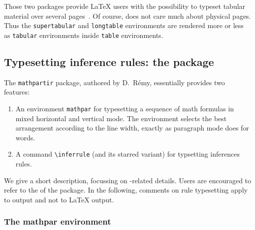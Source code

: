 Those two packages provide \LaTeX{} users with the
possibility to typeset tabular material over several
pages~\cite[Section~5.4]{latexbis}. Of course, \hevea{}
does not care much about physical pages.
Thus the \texttt{supertabular}
and \texttt{longtable} environments are rendered more or less
as \texttt{tabular} environments inside \texttt{table} environments.

\subsection{Typesetting inference rules: the
\label{mathpartir:package}  package}

The \texttt{mathpartir} package, authored by D.~R\'emy, essentially
provides two features:
\begin{enumerate}
\item
An environment \texttt{mathpar} for typesetting a sequence of math formulas in mixed horizontal and vertical mode. The environment selects the best arrangement according to the line width, exactly as paragraph mode does for words.
\item A command \verb+\inferrule+ (and its starred variant) for
typsetting inferences rules.
\end{enumerate}
We give a short description, focussing on \hevea{}-related details.
Users are encouraged to refer to the
 of the package.
\ifhevea
In the following, comments on rule typesetting apply to \hevea{} output
and not to \LaTeX{} output.

\subsubsection {The mathpar environment}

